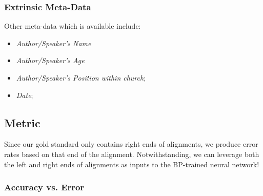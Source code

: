 \subsubsection{Extrinsic Meta-Data}
Other meta-data which is available include:
	\begin{itemize}
		\item \textit{Author/Speaker's Name}
		\item \textit{Author/Speaker's Age}
		\item \textit{Author/Speaker's Position within church};
		\item \textit{Date};
	\end{itemize}


\subsection{Metric}
Since our gold standard only contains right ends of alignments, we produce error rates based on that end of the alignment. Notwithstanding, we can leverage both the left and right ends of alignments as inputs to the BP-trained neural network!

\subsubsection{Accuracy vs. Error}



